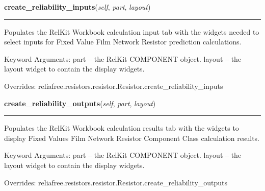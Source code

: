     \vspace{0.5ex}

\hspace{.8\funcindent}\begin{boxedminipage}{\funcwidth}

    \raggedright \textbf{create\_reliability\_inputs}(\textit{self}, \textit{part}, \textit{layout})

    \vspace{-1.5ex}

    \rule{\textwidth}{0.5\fboxrule}
\setlength{\parskip}{2ex}
    Populates the RelKit Workbook calculation input tab with the widgets
    needed to select inputs for Fixed Value Film Network Resistor 
    prediction calculations.

    Keyword Arguments: part   -- the RelKit COMPONENT object. layout -- 
    the layout widget to contain the display widgets.

\setlength{\parskip}{1ex}
      Overrides: reliafree.resistors.resistor.Resistor.create\_reliability\_inputs

    \end{boxedminipage}

    \vspace{0.5ex}

\hspace{.8\funcindent}\begin{boxedminipage}{\funcwidth}

    \raggedright \textbf{create\_reliability\_outputs}(\textit{self}, \textit{part}, \textit{layout})

    \vspace{-1.5ex}

    \rule{\textwidth}{0.5\fboxrule}
\setlength{\parskip}{2ex}
    Populates the RelKit Workbook calculation results tab with the 
    widgets to display Fixed Values Film Network Resistor Component Class 
    calculation results.

    Keyword Arguments: part   -- the RelKit COMPONENT object. layout -- 
    the layout widget to contain the display widgets.

\setlength{\parskip}{1ex}
      Overrides: reliafree.resistors.resistor.Resistor.create\_reliability\_outputs

    \end{boxedminipage}

    \vspace{0.5ex}

